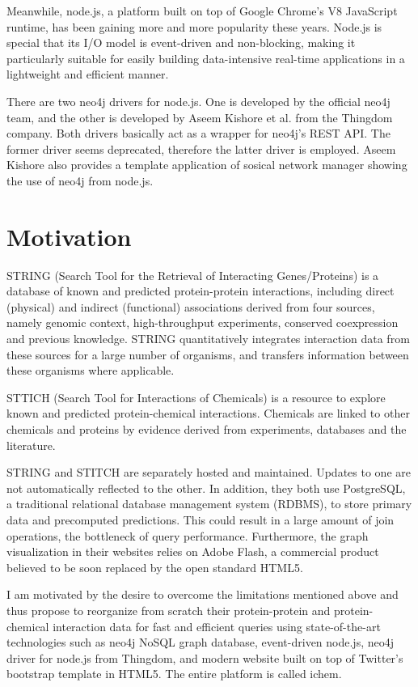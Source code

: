 \documentclass[10pt,conference,compsocconf]{../IEEEtran}
\begin{document}
Meanwhile, node.js, a platform built on top of Google Chrome's V8 JavaScript runtime, has been gaining more and more popularity these years. Node.js is special that its I/O model is event-driven and non-blocking, making it particularly suitable for easily building data-intensive real-time applications in a lightweight and efficient manner. 

There are two neo4j drivers for node.js. One is developed by the official neo4j team, and the other is developed by Aseem Kishore et al. from the Thingdom company. Both drivers basically act as a wrapper for neo4j's REST API. The former driver seems deprecated, therefore the latter driver is employed. Aseem Kishore also provides a template application of sosical network manager showing the use of neo4j from node.js.

\section{Motivation}

STRING (Search Tool for the Retrieval of Interacting Genes/Proteins) \citep{1070,1071,1072,1073,1074,1075} is a database of known and predicted protein-protein interactions, including direct (physical) and indirect (functional) associations derived from four sources, namely genomic context, high-throughput experiments, conserved coexpression and previous knowledge. STRING quantitatively integrates interaction data from these sources for a large number of organisms, and transfers information between these organisms where applicable.

STTICH (Search Tool for Interactions of Chemicals) \citep{1068,1069,1101} is a resource to explore known and predicted protein-chemical interactions. Chemicals are linked to other chemicals and proteins by evidence derived from experiments, databases and the literature.

STRING and STITCH are separately hosted and maintained. Updates to one are not automatically reflected to the other. In addition, they both use PostgreSQL, a traditional relational database management system (RDBMS), to store primary data and precomputed predictions. This could result in a large amount of join operations, the bottleneck of query performance. Furthermore, the graph visualization in their websites relies on Adobe Flash, a commercial product believed to be soon replaced by the open standard HTML5.

I am motivated by the desire to overcome the limitations mentioned above and thus propose to reorganize from scratch their protein-protein and protein-chemical interaction data for fast and efficient queries using state-of-the-art technologies such as neo4j NoSQL graph database, event-driven node.js, neo4j driver for node.js from Thingdom, and modern website built on top of Twitter's bootstrap template in HTML5. The entire platform is called ichem.
\end{document}
